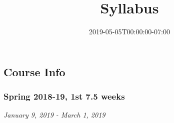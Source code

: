 \documentclass[]{article}
\title{Syllabus}
\author{}
\date{2019-05-05T00:00:00-07:00}
\begin{document}
\maketitle

{
\setcounter{tocdepth}{3}
\tableofcontents
}
\hypertarget{course-info}{%
\subsection{Course Info}\label{course-info}}

\hypertarget{spring-2018-19-1st-7.5-weeks}{%
\subsubsection{Spring 2018-19, 1st 7.5
weeks}\label{spring-2018-19-1st-7.5-weeks}}

\emph{January 9, 2019 - March 1, 2019}
\end{document}
